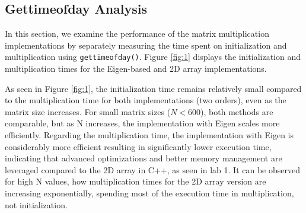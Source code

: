 \documentclass{article}
\begin{document}
    
    \subsection{Gettimeofday Analysis}

    In this section, we examine the performance of the matrix multiplication implementations by separately measuring the time spent on initialization and multiplication using \texttt{gettimeofday()}. Figure \ref{fig:1} displays the initialization and multiplication times for the Eigen-based and 2D array implementations.

    As seen in Figure \ref{fig:1}, the initialization time remains relatively small compared to the multiplication time for both implementations (two orders), even as the matrix size increases. For small matrix sizes (\(N < 600\)), both methods are comparable, but as N increases, the implementation with Eigen scales more efficiently. Regarding the multiplication time, the implementation with Eigen is considerably more efficient resulting in significantly lower execution time, indicating that advanced optimizations and better memory management are leveraged compared to the 2D array in C++, as seen in lab 1. It can be observed for high N values, how multiplication times for the 2D array version are increasing exponentially, spending most of the execution time in multiplication, not initialization.
\end{document}

